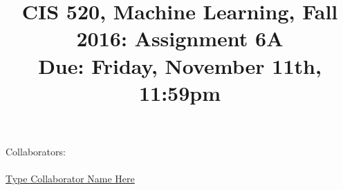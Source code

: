\documentclass[english]{article}
\title{CIS 520, Machine Learning, Fall 2016: Assignment 6A \\
Due: Friday, November 11th, 11:59pm \\
\points{54} }
\date{}
\begin{document}
\maketitle
{\normalsize Collaborators: \\ 
\\ \underline{ Type Collaborator Name Here        }}


\end{document}
